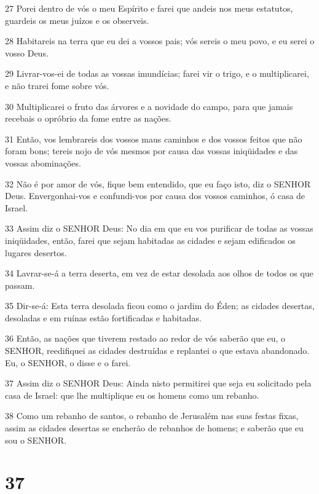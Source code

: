 \par 27 Porei dentro de vós o meu Espírito e farei que andeis nos meus estatutos, guardeis os meus juízos e os observeis.
\par 28 Habitareis na terra que eu dei a vossos pais; vós sereis o meu povo, e eu serei o vosso Deus.
\par 29 Livrar-vos-ei de todas as vossas imundícias; farei vir o trigo, e o multiplicarei, e não trarei fome sobre vós.
\par 30 Multiplicarei o fruto das árvores e a novidade do campo, para que jamais recebais o opróbrio da fome entre as nações.
\par 31 Então, vos lembrareis dos vossos maus caminhos e dos vossos feitos que não foram bons; tereis nojo de vós mesmos por causa das vossas iniqüidades e das vossas abominações.
\par 32 Não é por amor de vós, fique bem entendido, que eu faço isto, diz o SENHOR Deus. Envergonhai-vos e confundi-vos por causa dos vossos caminhos, ó casa de Israel.
\par 33 Assim diz o SENHOR Deus: No dia em que eu vos purificar de todas as vossas iniqüidades, então, farei que sejam habitadas as cidades e sejam edificados os lugares desertos.
\par 34 Lavrar-se-á a terra deserta, em vez de estar desolada aos olhos de todos os que passam.
\par 35 Dir-se-á: Esta terra desolada ficou como o jardim do Éden; as cidades desertas, desoladas e em ruínas estão fortificadas e habitadas.
\par 36 Então, as nações que tiverem restado ao redor de vós saberão que eu, o SENHOR, reedifiquei as cidades destruídas e replantei o que estava abandonado. Eu, o SENHOR, o disse e o farei.
\par 37 Assim diz o SENHOR Deus: Ainda nisto permitirei que seja eu solicitado pela casa de Israel: que lhe multiplique eu os homens como um rebanho.
\par 38 Como um rebanho de santos, o rebanho de Jerusalém nas suas festas fixas, assim as cidades desertas se encherão de rebanhos de homens; e saberão que eu sou o SENHOR.

\chapter{37}

